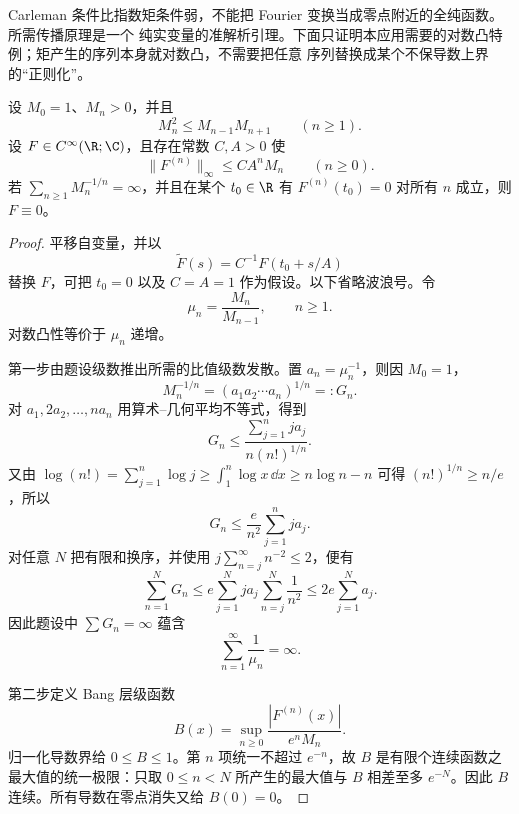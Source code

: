 Carleman 条件比指数矩条件弱，不能把 Fourier 变换当成零点附近的全纯函数。所需传播原理是一个
纯实变量的准解析引理。下面只证明本应用需要的对数凸特例；矩产生的序列本身就对数凸，不需要把任意
序列替换成某个不保导数上界的“正则化”。

\begin{lemma}\label{lemma:7-3-3-carleman-bang}
设 $M_0=1$、$M_n>0$，并且
\[
 M_n^2\leq M_{n-1}M_{n+1}\qquad(n\geq1).
\]
设 $F\in C^\infty(\R;\C)$，且存在常数 $C,A>0$ 使
\[
 \|F^{(n)}\|_\infty\leq CA^nM_n\qquad(n\geq0).
\]
若
$\sum_{n\geq1}M_n^{-1/n}=\infty$，并且在某个 $t_0\in\R$ 有
$F^{(n)}(t_0)=0$ 对所有 $n$ 成立，则 $F\equiv0$。
\end{lemma}

\begin{proof}
平移自变量，并以
\[
 \widetilde F(s)=C^{-1}F(t_0+s/A)
\]
替换 $F$，可把 $t_0=0$ 以及 $C=A=1$ 作为假设。以下省略波浪号。令
\[
 \mu_n=\frac{M_n}{M_{n-1}},\qquad n\geq1.
\]
对数凸性等价于 $\mu_n$ 递增。

第一步由题设级数推出所需的比值级数发散。置 $a_n=\mu_n^{-1}$，则因 $M_0=1$，
\[
 M_n^{-1/n}=(a_1a_2\cdots a_n)^{1/n}=:G_n.
\]
对 $a_1,2a_2,\ldots,na_n$ 用算术--几何平均不等式，得到
\[
 G_n\leq\frac{\sum_{j=1}^nj a_j}{n(n!)^{1/n}}.
\]
又由
$\log(n!)=\sum_{j=1}^n\log j\geq\int_1^n\log x\,\dd x\geq n\log n-n$
可得 $(n!)^{1/n}\geq n/e$，所以
\begin{equation}\label{eq:7-3-carleman-amgm}
 G_n\leq\frac{e}{n^2}\sum_{j=1}^nj a_j.
\end{equation}
对任意 $N$ 把有限和换序，并使用
$j\sum_{n=j}^\infty n^{-2}\leq2$，便有
\[
 \sum_{n=1}^NG_n
 \leq e\sum_{j=1}^Nj a_j\sum_{n=j}^N\frac1{n^2}
 \leq2e\sum_{j=1}^Na_j.
\]
因此题设中 $\sum G_n=\infty$ 蕴含
\begin{equation}\label{eq:7-3-carleman-ratio-divergence}
 \sum_{n=1}^\infty\frac1{\mu_n}=\infty.
\end{equation}

第二步定义 Bang 层级函数
\begin{equation}\label{eq:7-3-bang-function}
 B(x)=\sup_{n\geq0}\frac{|F^{(n)}(x)|}{e^nM_n}.
\end{equation}
归一化导数界给 $0\leq B\leq1$。第 $n$ 项统一不超过 $e^{-n}$，故
$B$ 是有限个连续函数之最大值的统一极限：只取 $0\leq n<N$ 所产生的最大值与 $B$ 相差至多
$e^{-N}$。因此 $B$ 连续。所有导数在零点消失又给 $B(0)=0$。


\end{proof}

